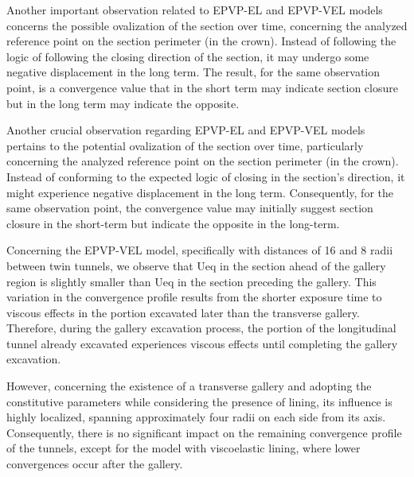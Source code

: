 \documentclass[a4paper,fleqn]{cas-sc}
\begin{document}
Another important observation related to EPVP-EL and EPVP-VEL models concerns the possible ovalization of the section over time, concerning the analyzed reference point on the section perimeter (in the crown). Instead of following the logic of following the closing direction of the section, it may undergo some negative displacement in the long term. The result, for the same observation point, is a convergence value that in the short term may indicate section closure but in the long term may indicate the opposite.

Another crucial observation regarding EPVP-EL and EPVP-VEL models pertains to the potential ovalization of the section over time, particularly concerning the analyzed reference point on the section perimeter (in the crown). Instead of conforming to the expected logic of closing in the section's direction, it might experience negative displacement in the long term. Consequently, for the same observation point, the convergence value may initially suggest section closure in the short-term but indicate the opposite in the long-term.

Concerning the EPVP-VEL model, specifically with distances of 16 and 8 radii between twin tunnels, we observe that Ueq in the section ahead of the gallery region is slightly smaller than Ueq in the section preceding the gallery. This variation in the convergence profile results from the shorter exposure time to viscous effects in the portion excavated later than the transverse gallery. Therefore, during the gallery excavation process, the portion of the longitudinal tunnel already excavated experiences viscous effects until completing the gallery excavation. 

However, concerning the existence of a transverse gallery and adopting the constitutive parameters while considering the presence of lining, its influence is highly localized, spanning approximately four radii on each side from its axis. Consequently, there is no significant impact on the remaining convergence profile of the tunnels, except for the model with viscoelastic lining, where lower convergences occur after the gallery. 


\end{document}
